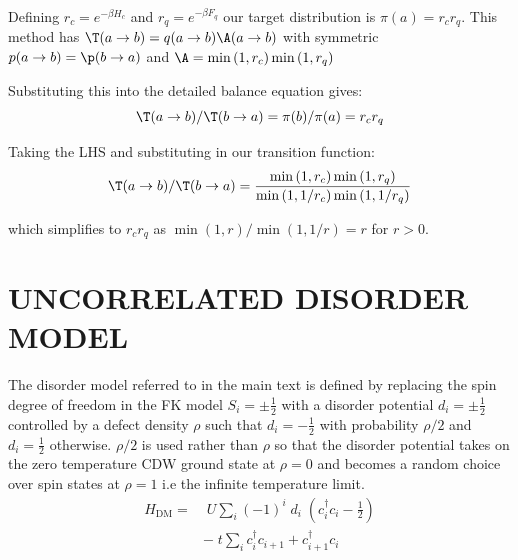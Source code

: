 Defining \(r_c = e^{-\beta H_c}\) and \(r_q = e^{-\beta F_q}\) our target distribution is \(\pi(a) = r_c r_q\). This method has \(\T(a\to b) = q(a\to b)\A(a \to b)\) with symmetric \(p(a \to b) = \p(b \to a)\) and \(\A = \min\left(1, r_c\right) \min\left(1, r_q\right)\) 

 Substituting this into the detailed balance equation gives: 
\[\T(a \to b)/\T(b \to a) = \pi(b)/\pi(a) = r_c r_q\]

Taking the LHS and substituting in our transition function:
\begin{align}
\T(a \to b)/\T(b \to a) = \frac{\min\left(1, r_c\right) \min\left(1, r_q\right)}{ \min\left(1, 1/r_c\right) \min\left(1, 1/r_q\right)}
\end{align}

which simplifies to \(r_c r_q\) as \(\min(1,r)/\min(1,1/r) = r\) for \(r > 0\). 

\section{\label{app:disorder_model}
UNCORRELATED DISORDER MODEL
}

The disorder model referred to in the main text is defined by replacing the spin degree of freedom in the FK model \(S_i = \pm \tfrac{1}{2}\) with a disorder potential \(d_i = \pm \tfrac{1}{2}\) controlled by a defect density \(\rho\) such that \(d_i = -\tfrac{1}{2}\) with probability \(\rho/2\) and \(d_i = \tfrac{1}{2}\) otherwise. \(\rho/2\) is used rather than \(\rho\) so that the disorder potential takes on the zero temperature CDW ground state at \(\rho = 0\) and becomes a random choice over spin states at \(\rho = 1\) i.e the infinite temperature limit.
~
\begin{align}
H_{\mathrm{DM}} = & \;U \sum_{i} (-1)^i \; d_i \;(c^\dag_{i}c_{i} - \tfrac{1}{2}) \\
& -\;t \sum_{i} c^\dag_{i}c_{i+1} + c^\dag_{i+1}c_{i} \nonumber
\end{align}





